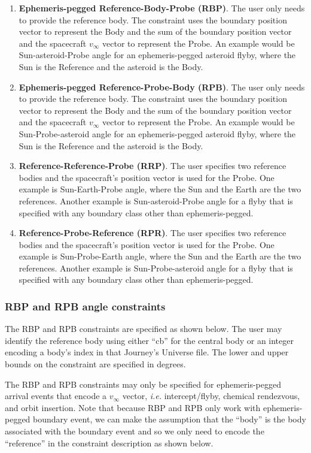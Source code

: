 \documentclass[11pt]{article}
\begin{document}
\begin{enumerate}
	\item \textbf{Ephemeris-pegged Reference-Body-Probe (RBP)}. The user only needs to provide the reference body. The constraint uses the boundary position vector to represent the Body and the sum of the boundary position vector and the spacecraft $v_\infty$ vector to represent the Probe. An example would be Sun-asteroid-Probe angle for an ephemeris-pegged asteroid flyby, where the Sun is the Reference and the asteroid is the Body.
	\item \textbf{Ephemeris-pegged Reference-Probe-Body (RPB)}. The user only needs to provide the reference body. The constraint uses the boundary position vector to represent the Body and the sum of the boundary position vector and the spacecraft $v_\infty$ vector to represent the Probe. An example would be Sun-Probe-asteroid angle for an ephemeris-pegged asteroid flyby, where the Sun is the Reference and the asteroid is the Body.
	\item \textbf{Reference-Reference-Probe (RRP)}. The user specifies two reference bodies and the spacecraft's position vector is used for the Probe. One example is Sun-Earth-Probe angle, where the Sun and the Earth are the two references. Another example is Sun-asteroid-Probe angle for a flyby that is specified with any boundary class other than ephemeris-pegged.
	\item \textbf{Reference-Probe-Reference (RPR)}. The user specifies two reference bodies and the spacecraft's position vector is used for the Probe. One example is Sun-Probe-Earth angle, where the Sun and the Earth are the two references. Another example is Sun-Probe-asteroid angle for a flyby that is specified with any boundary class other than ephemeris-pegged.
\end{enumerate}

\subsubsection{RBP and RPB angle constraints}
\label{subsubsec:RBP_and_RPB}

The RBP and RPB constraints are specified as shown below. The user may identify the reference body using either ``cb'' for the central body or an integer encoding a body's index in that Journey's Universe file. The lower and upper bounds on the constraint are specified in degrees.

The RBP and RPB constraints may only be specified for ephemeris-pegged arrival events that encode a $v_\infty$ vector, \textit{i.e.} intercept/flyby, chemical rendezvous, and orbit insertion. Note that because RBP and RPB only work with ephemeris-pegged boundary event, we can make the assumption that the ``body'' is the body associated with the boundary event and so we only need to encode the ``reference'' in the constraint description as shown below.
\end{document}
